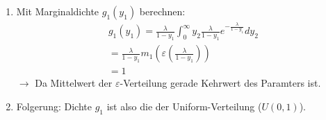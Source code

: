 \documentclass{article}
\begin{document}
\begin{enumerate}
	\item Mit Marginaldichte $g_1(y_1)$ berechnen:\\
		\begin{align}
			g_1(y_1) = \frac{\lambda}{1 - y_1} \int^\infty_0 y_2\frac{\lambda}{1 - y_1}
			e^{-\frac{\lambda}{1 - y_1}} dy_2\\
			= \frac{\lambda}{1 - y_1} m_1 (\varepsilon(\frac{\lambda}{1 - y_1}))\\
			= 1
		\end{align}
		$\longrightarrow$ Da Mittelwert der $\varepsilon$-Verteilung gerade Kehrwert des
		Paramters ist.
	\item Folgerung: Dichte $g_1$ ist also die der Uniform-Verteilung ($U(0,1)$).
\end{enumerate}
\end{document}
